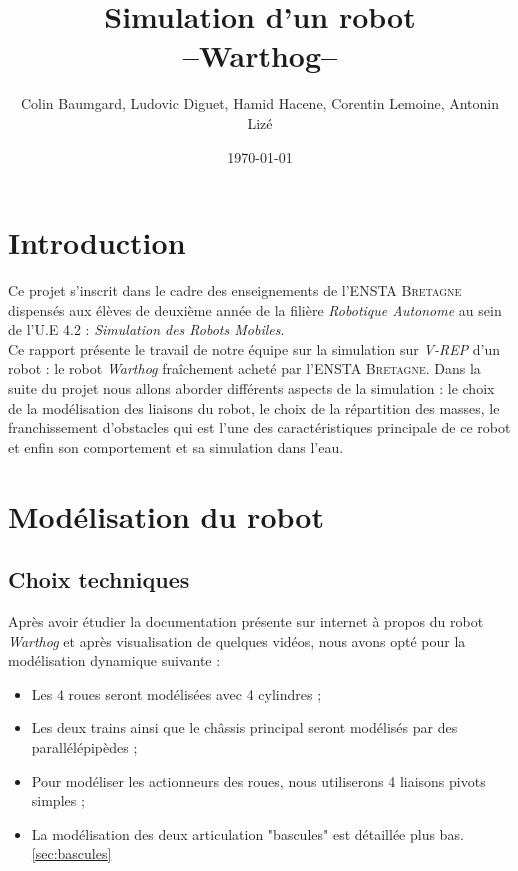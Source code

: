 \documentclass[12pt, openany]{report}
\title{Simulation d'un robot \\ --Warthog--}
\author{Colin Baumgard, Ludovic Diguet, Hamid Hacene, Corentin Lemoine, Antonin Lizé}
\date{\today}
\begin{document}
\maketitle
\tableofcontents

\section*{Introduction} 
Ce projet s'inscrit dans le cadre des enseignements de l'\textsc{ENSTA Bretagne} dispensés aux élèves de deuxième année de la filière \textit{Robotique Autonome} au sein de l'U.E 4.2 : \textit{Simulation des Robots Mobiles}.\\

Ce rapport présente le travail de notre équipe sur la simulation sur \textit{V-REP} d'un robot : le robot \textit{Warthog} fraîchement acheté par l'\textsc{ENSTA Bretagne}.
Dans la suite du projet nous allons aborder différents aspects de la simulation : le choix de la modélisation des liaisons du robot, le choix de la répartition des masses, le franchissement d'obstacles qui est l'une des caractéristiques principale de ce robot et enfin son comportement et sa simulation dans l'eau.

\section{Modélisation du robot}
\subsection{Choix techniques}
Après avoir étudier la documentation présente sur internet à propos du robot \textit{Warthog} et après visualisation de quelques vidéos, nous avons opté pour la modélisation dynamique suivante :

\begin{itemize}[label=\textbullet, font=\small]
    \item Les 4 roues seront modélisées avec 4 cylindres ;
    \item Les deux trains ainsi que le châssis principal seront modélisés par des parallélépipèdes ;
    \item Pour modéliser les actionneurs des roues, nous utiliserons 4 liaisons pivots simples ; 
    \item La modélisation des deux articulation "bascules" est détaillée plus bas. \ref{sec:bascules}
\end{itemize}
\end{document}

